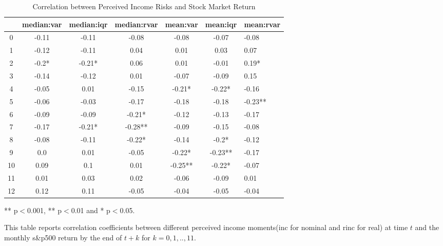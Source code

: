 
\begin{table}[ht]
\centering
\begin{adjustbox}{width={\textwidth}}
\begin{threeparttable}
\caption{Correlation between Perceived Income Risks and Stock Market Return}
\label{macro_corr}
\begin{tabular}{ccccccl}
\toprule
{} & median:var & median:iqr & median:rvar & mean:var & mean:iqr & mean:rvar \\
\midrule
0  &      -0.11 &      -0.11 &       -0.08 &    -0.08 &    -0.07 &     -0.08 \\
1  &      -0.12 &      -0.11 &        0.04 &     0.01 &     0.03 &      0.07 \\
2  &      -0.2* &     -0.21* &        0.06 &     0.01 &    -0.01 &     0.19* \\
3  &      -0.14 &      -0.12 &        0.01 &    -0.07 &    -0.09 &      0.15 \\
4  &      -0.05 &       0.01 &       -0.15 &   -0.21* &   -0.22* &     -0.16 \\
5  &      -0.06 &      -0.03 &       -0.17 &    -0.18 &    -0.18 &   -0.23** \\
6  &      -0.09 &      -0.09 &      -0.21* &    -0.12 &    -0.13 &     -0.17 \\
7  &      -0.17 &     -0.21* &     -0.28** &    -0.09 &    -0.15 &     -0.08 \\
8  &      -0.08 &      -0.11 &      -0.22* &    -0.14 &    -0.2* &     -0.12 \\
9  &        0.0 &       0.01 &       -0.05 &   -0.22* &  -0.23** &     -0.17 \\
10 &       0.09 &        0.1 &        0.01 &  -0.25** &   -0.22* &     -0.07 \\
11 &       0.01 &       0.03 &        0.02 &    -0.06 &    -0.09 &      0.01 \\
12 &       0.12 &       0.11 &       -0.05 &    -0.04 &    -0.05 &     -0.04 \\
\bottomrule
\end{tabular}
\begin{tablenotes}
\item *** p$<$0.001, ** p$<$0.01 and * p$<$0.05.
\item This table reports correlation coefficients between different perceived income moments(inc for nominal
and rinc for real) at time
$t$ and the monthly s\&p500 return by the end of $t+k$ for $k=0,1,..,11$.
\end{tablenotes}
\end{threeparttable}
\end{adjustbox}
\end{table}